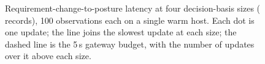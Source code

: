 \begin{figure}[pos=tbp]
\centering

\caption{Requirement-change-to-posture latency at four decision-basis sizes (\FixSizes{} records), 100 observations each on a single warm host. Each dot is one update; the line joins the slowest update at each size; the dashed line is the 5\,s gateway budget, with the number of updates over it above each size. \ScaleFigureSentence{}}
\label{fig:scale-latency}
\end{figure}
